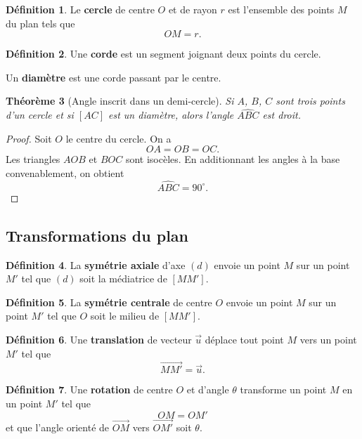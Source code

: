 \documentclass[11pt,a4paper]{article}
\newcommand{\uu}{\overrightarrow{u}}
\theoremstyle{definition}
\newtheorem{definition}{Définition}[section]
\theoremstyle{plain}
\newtheorem{theoreme}[definition]{Théorème}
\begin{document}
\begin{definition}
Le \textbf{cercle} de centre $O$ et de rayon $r$ est l'ensemble des points $M$ du plan tels que
\[
OM=r.
\]
\end{definition}

\begin{definition}
Une \textbf{corde} est un segment joignant deux points du cercle.

Un \textbf{diamètre} est une corde passant par le centre.
\end{definition}

\begin{theoreme}[Angle inscrit dans un demi-cercle]
Si $A$, $B$, $C$ sont trois points d'un cercle et si $[AC]$ est un diamètre, alors l'angle $\widehat{ABC}$ est droit.
\end{theoreme}

\begin{proof}
Soit $O$ le centre du cercle.
On a
\[
OA=OB=OC.
\]
Les triangles $AOB$ et $BOC$ sont isocèles.
En additionnant les angles à la base convenablement, on obtient
\[
\widehat{ABC}=90^\circ.
\]
\end{proof}

\subsection{Transformations du plan}

\begin{definition}
La \textbf{symétrie axiale} d'axe $(d)$ envoie un point $M$ sur un point $M'$ tel que $(d)$ soit la médiatrice de $[MM']$.
\end{definition}

\begin{definition}
La \textbf{symétrie centrale} de centre $O$ envoie un point $M$ sur un point $M'$ tel que $O$ soit le milieu de $[MM']$.
\end{definition}

\begin{definition}
Une \textbf{translation} de vecteur $\uu$ déplace tout point $M$ vers un point $M'$ tel que
\[
\overrightarrow{MM'}=\uu.
\]
\end{definition}

\begin{definition}
Une \textbf{rotation} de centre $O$ et d'angle $\theta$ transforme un point $M$ en un point $M'$ tel que
\[
OM=OM'
\]
et que l'angle orienté de $\overrightarrow{OM}$ vers $\overrightarrow{OM'}$ soit $\theta$.
\end{definition}
\end{document}
